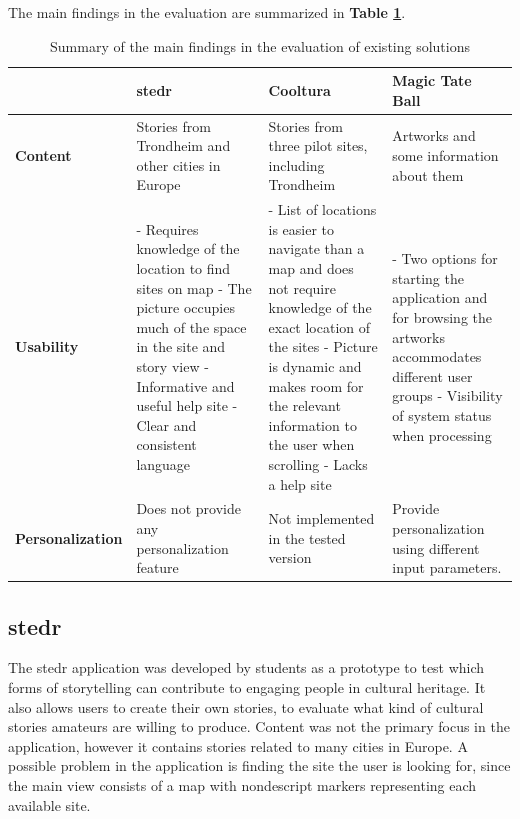 The main findings in the evaluation are summarized in \textbf{Table \ref{Tab:existing_solutions}}.

\begin{table}[t]
	\caption{Summary of the main findings in the evaluation of existing solutions}
	\begin{tabular}[b]{ | p{2.7cm} | >{\raggedright}p{4.3cm} | >{\raggedright}p{4.3cm} | p{4.3cm} |}
		\hline
		\textbf{} & \textbf{stedr} & \textbf{Cooltura} & \textbf{Magic Tate Ball} \\ \hline
		\textbf{Content} & Stories from Trondheim and other cities in Europe & Stories from three pilot sites, including Trondheim & Artworks and some information about them \\ \hline
		\textbf{Usability} & 
			- Requires knowledge of the location to find sites on map \newline
			- The picture occupies much of the space in the site and story view \newline
			- Informative and useful help site\newline
			- Clear and consistent language 
			& 
			- List of locations is easier to navigate than a map and does not require knowledge of the exact location of the sites\newline
			- Picture is dynamic and makes room for the relevant information to the user when scrolling \newline
			- Lacks a help site
			&  
			- Two options for starting the application and for browsing the artworks accommodates different user groups \newline
			- Visibility of system status when processing 
			 \\ \hline
		\textbf{Personalization} & Does not provide any personalization feature & Not implemented in the tested version & Provide personalization using different input parameters.  \\ \hline
	\end{tabular}
	\label{Tab:existing_solutions}
\end{table}

\subsection{stedr}
\label{subsec:stedr}

The stedr application was developed by students as a prototype to test which forms of storytelling can contribute to engaging people in cultural heritage. It also allows users to create their own stories, to evaluate what kind of cultural stories amateurs are willing to produce. Content was not the primary focus in the application, however it contains stories related to many cities in Europe. A possible problem in the application is finding the site the user is looking for, since the main view consists of a map with nondescript markers representing each available site. \newline

